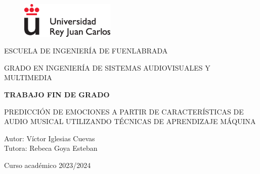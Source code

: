 \documentclass[12pt,a4paper]{article}
\begin{document}

\begin{titlepage}
	
\begin{center}
	\begin{figure}
		\centering
		\includegraphics[width=0.4\textwidth]{./figs/logoURJC}
	\end{figure}
\end{center}


\begin{center}
	\large
	ESCUELA DE INGENIERÍA DE FUENLABRADA
	\vspace*{0.15in}
\end{center}

\begin{center}
	\large
	GRADO EN INGENIERÍA DE SISTEMAS AUDIOVISUALES Y MULTIMEDIA \\
	\vspace*{0.6in}
\end{center}

\begin{center}
	{\large \bf TRABAJO FIN DE GRADO}\\
\end{center}

\begin{center}
	\vspace*{0.2in}
	{\large
	{PREDICCIÓN DE EMOCIONES A PARTIR DE CARACTERÍSTICAS DE AUDIO MUSICAL UTILIZANDO TÉCNICAS DE APRENDIZAJE MÁQUINA} \\
	}
	\vspace*{0.3in}
	\vspace*{0.3in}
	\vspace*{0.1in}
\end{center}


\begin{center}
	{\large
	Autor: Víctor Iglesias Cuevas  \\[0.2cm]
	Tutora: Rebeca Goya Esteban \\[0.15cm]
	}
	\vspace*{0.1in}
	\vspace*{0.1in}
\end{center}


\begin{center}
	Curso académico 2023/2024\end{center}
\end{titlepage}
\end{document}
